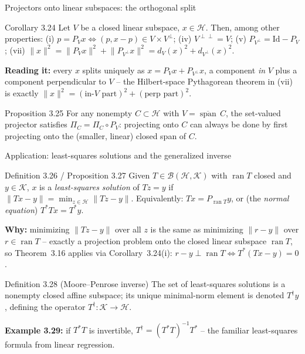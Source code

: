 \documentclass[aspectratio=169,10pt]{beamer}
\newcommand{\Hil}{\mathcal{H}}
\newcommand{\Kil}{\mathcal{K}}
\newcommand{\Id}{\mathrm{Id}}
\newcommand{\spn}{\operatorname{span}}
\newcommand{\ran}{\operatorname{ran}}
\newcommand{\norm}[1]{\lVert #1 \rVert}
\begin{document}
\begin{frame}{Projectors onto linear subspaces: the orthogonal split}
  \begin{block}{Corollary 3.24}
    Let $V$ be a closed linear subspace, $x\in\Hil$. Then, among other
    properties: (i) $p=P_Vx \iff (p,x-p)\in V\times V^{\perp}$; (iv)
    $V^{\perp\perp}=V$; (v) $P_{V^{\perp}} = \Id - P_V$; (vii)
    $\norm{x}^2 = \norm{P_Vx}^2+\norm{P_{V^\perp}x}^2 = d_V(x)^2+d_{V^\perp}(x)^2$.
  \end{block}
  \textbf{Reading it:} every $x$ splits uniquely as $x = P_Vx + P_{V^\perp}x$,
  a component \emph{in} $V$ plus a component perpendicular to $V$ -- the
  Hilbert-space Pythagorean theorem in (vii) is exactly $\norm x^2 =
  (\text{in-}V\text{ part})^2 + (\text{perp part})^2$.

  \begin{block}{Proposition 3.25}
    For any nonempty $C\subset\Hil$ with $V=\overline{\spn}\,C$, the
    set-valued projector satisfies $\Pi_C = \Pi_C\circ P_V$: projecting onto
    $C$ can always be done by first projecting onto the (smaller, linear)
    closed span of $C$.
  \end{block}
\end{frame}

\begin{frame}{Application: least-squares solutions and the generalized inverse}
  \begin{block}{Definition 3.26 / Proposition 3.27}
    Given $T\in\mathcal B(\Hil,\Kil)$ with $\ran T$ closed and $y\in\Kil$,
    $x$ is a \emph{least-squares solution} of $Tz=y$ if
    $\norm{Tx-y}=\min_{z\in\Hil}\norm{Tz-y}$. Equivalently: $Tx = P_{\ran T}y$,
    or (the \emph{normal equation}) $T^*Tx = T^*y$.
  \end{block}
  \textbf{Why:} minimizing $\norm{Tz-y}$ over all $z$ is the same as
  minimizing $\norm{r-y}$ over $r\in\ran T$ -- exactly a projection problem
  onto the closed linear subspace $\ran T$, so Theorem~3.16 applies via
  Corollary~3.24(i): $r-y\perp \ran T \iff T^*(Tx-y)=0$.

  \begin{block}{Definition 3.28 (Moore--Penrose inverse)}
    The set of least-squares solutions is a nonempty closed affine subspace;
    its unique minimal-norm element is denoted $T^\dagger y$, defining the
    operator $T^\dagger\colon\Kil\to\Hil$.
  \end{block}
  \textbf{Example 3.29:} if $T^*T$ is invertible, $T^\dagger = (T^*T)^{-1}T^*$
  -- the familiar least-squares formula from linear regression.
\end{frame}
\end{document}
